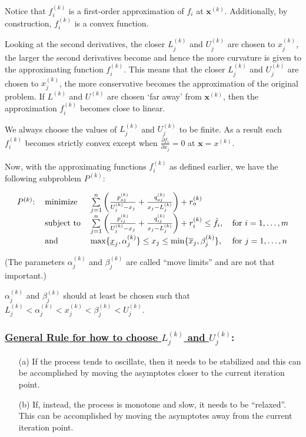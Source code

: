 \documentclass[11pt]{article}
\begin{document}
Notice that $f_i^{(k)}$ is a first-order approximation of $f_i$ at $\mathbf{x}^{(k)}$. Additionally, by construction, $f_i^{(k)}$ is a {\color{tiananmen}convex function}.

Looking at the second derivatives, the closer $L_j^{(k)}$ and $U_j^{(k)}$ are chosen to $x_j^{(k)}$, the larger the second derivatives become and hence the more curvature is given to the approximating function $f_i^{(k)}$. This means that the closer $L_j^{(k)}$ and $U_j^{(k)}$ are chosen to $x_j^{(k)}$, the more conservative becomes the approximation of the original problem. If $L^{(k)}$ and $U^{(k)}$ are chosen `far away' from $\mathbf{x}^{(k)}$, then the approximation $f_i^{(k)}$ becomes close to linear.

We always choose the values of $L_j^{(k)}$ and $U_j^{(k)}$ to be finite. As a result each $f_i^{(k)}$ becomes strictly convex except when $\frac{\partial f_i}{\partial x_j}=0$ at $\mathbf{x}=x^{(k)}$.

Now, with the approximating functions $f_i^{(k)}$ as defined earlier, we have the following subproblem $P^{(k)}$:

{\color{baystate}
	\begin{equation}
		\begin{tabular}{llll}
			$P^{(k)}$: & minimize & $\sum\limits_{j=1}^{n}\left(\frac{p_{oj}^{(k)}}{U_j^{(k)}-x_j}+\frac{q_{oj}^{(k)}}{x_j-L_j^{(k)}}\right)+r_o^{(k)}$ &  \\
			& subject to & $\sum\limits_{j=1}^{n}\left(\frac{p_{ij}^{(k)}}{U_j^{(k)}-x_j}+\frac{q_{ij}^{(k)}}{x_j-L_j^{(k)}}\right)+r_i^{(k)}\leq\hat{f}_i$, & for $i=1,\ldots,m$ \\
			& and & $\max\lbrace\underline{x}_j,\alpha_j^{(k)}\rbrace\leq x_j\leq \min\lbrace \overline{x}_j,\beta_j^{(k)}\rbrace$, & for $j=1,\ldots,n$
		\end{tabular}
	\end{equation}
}

(The parameters $\alpha_j^{(k)}$ and $\beta_j^{(k)}$ are called ``{\color{tiananmen}move limits}'' and are not that important.)

$\alpha_j^{(k)}$ and $\beta_j^{(k)}$ should at least be chosen such that $L_j^{(k)}<\alpha_j^{(k)}<x_j^{(k)}<\beta_j^{(k)}<U_j^{(k)}$.

\subsubsection*{\underline{General Rule for how to choose $L_j^{(k)}$ and $U_j^{(k)}$}:}
\begin{itemize}
	\item[(a)] If the process tends to oscillate, then it needs to be stabilized and this can be accomplished by moving the asymptotes closer to the current iteration point.
	\item[(b)] If, instead, the process is monotone and slow, it needs to be ``relaxed''. This can be accomplished by moving the asymptotes away from the current iteration point.
\end{itemize}
\end{document}
